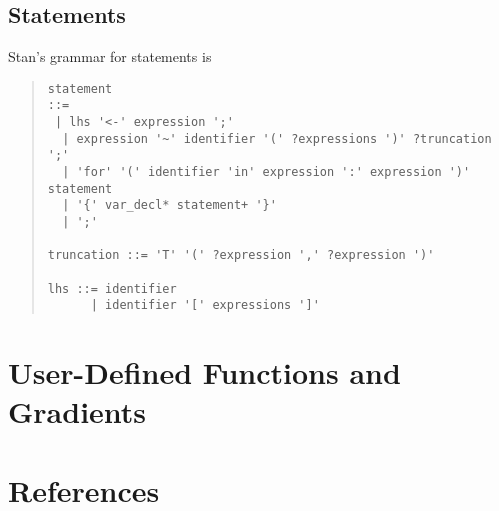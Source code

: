 \documentclass[10pt]{report}
\newcommand{\Stan}{Stan\xspace}
\begin{document}
\section{Statements}

\Stan's grammar for statements is
%
\begin{quote}
\begin{Verbatim}
statement 
::= 
 | lhs '<-' expression ';'
  | expression '~' identifier '(' ?expressions ')' ?truncation ';'
  | 'for' '(' identifier 'in' expression ':' expression ')' statement
  | '{' var_decl* statement+ '}'
  | ';'

truncation ::= 'T' '(' ?expression ',' ?expression ')' 

lhs ::= identifier
      | identifier '[' expressions ']'

\end{Verbatim}
\end{quote}



\chapter{User-Defined Functions and Gradients}\label{user-defined-functions.appendix}




\chapter*{References}
\end{document}
